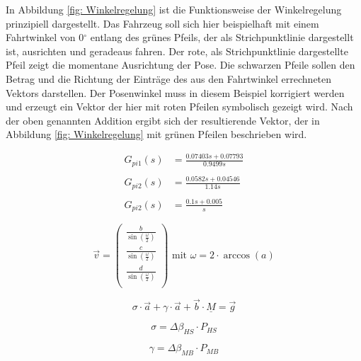 		In Abbildung \ref{fig: Winkelregelung} ist die Funktionsweise der Winkelregelung prinzipiell dargestellt. Das Fahrzeug soll sich hier beispielhaft mit einem Fahrtwinkel von 0$^\circ$ entlang des grünes Pfeils, der als Strichpunktlinie dargestellt ist, ausrichten und geradeaus fahren. Der rote, als Strichpunktlinie dargestellte Pfeil zeigt die momentane Ausrichtung der Pose. Die schwarzen Pfeile sollen den Betrag und die Richtung der Einträge des aus den Fahrtwinkel errechneten Vektors darstellen. Der Posenwinkel muss in diesem Beispiel korrigiert werden und erzeugt ein Vektor der hier mit roten Pfeilen symbolisch gezeigt wird. Nach der oben genannten Addition ergibt sich der resultierende Vektor, der in Abbildung \ref{fig: Winkelregelung} mit grünen Pfeilen beschrieben wird. 
		
		
		
		\begin{align}
		\label{eq: gpi1}
		G_{pi1}(s) &= \frac{0.07403s+0.07793}{0.9499s}\\\nonumber\\
		\label{eq: gpi2}
		G_{pi2}(s) &= \frac{0.0582s+0.04546}{1.14s}\\\nonumber\\
		\label{eq: gpi3}
		G_{pi2}(s) &= \frac{0.1s+0.005}{s}
		\end{align}
		
		\begin{equation}
		\vec{v}=\left(
		\begin{array}{c}
		\frac{b}{\sin(\frac{\omega}{2})}\\
		\frac{c}{\sin(\frac{\omega}{2})}\\
		\frac{d}{\sin(\frac{\omega}{2})}\\
		\end{array}\right) \text { mit }  \omega =2\cdot\arccos(a)
		\label{eq: quaternion vektorlage}
		\end{equation}\newline
		
		\begin{equation}
		\sigma \cdot \vec{a} + \gamma \cdot \vec{a} + \vec{b} \cdot \underline{M} = \vec{g} 
		\label{eq: winkeleq}
		\end{equation}
		
		\begin{equation}
		\sigma = \Delta \beta_{HS} \cdot P_{HS} 
		\end{equation}
			
			
		\begin{equation}
		\gamma = \Delta \beta_{MB} \cdot P_{MB} 
		\end{equation}
		
